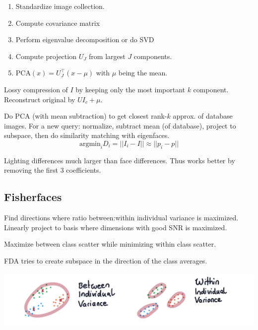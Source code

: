 \begin{definition}
  \begin{enumerate}
    \item Standardize image collection.
    \item Compute covariance matrix
    \item Perform eigenvalue decomposition or do SVD
    \item Compute projection \(U_J\) from largest \(J\) components.
    \item \(\text{PCA}(x) = U_J^\top(x - \mu)\) with \(\mu\) being the mean.
  \end{enumerate}
\end{definition}

\begin{definition}
  Lossy compression of \(I\) by keeping only the most important \(k\) component. Reconstruct original by \(UI_c + \mu\).
\end{definition}

\begin{algorithm}
  Do PCA (with mean subtraction) to get closest rank-\(k\) approx. of database images. For a new query: normalize, subtract mean (of database), project to subspace, then do similarity matching with eigenfaces.
  \[\text{argmin}_i D_i = ||I_i - I|| \approx ||p_i - p||\]
\end{algorithm}

\begin{theorem}
  Lighting differences much larger than face differences. Thus works better by removing the first 3 coefficients.
\end{theorem}

\subsection{Fisherfaces}
Find directions where ratio between:within individual variance is maximized. Linearly project to basis where dimensions with good SNR is maximized.

\begin{algorithm}
  Maximize between class scatter while minimizing within class scatter.
\end{algorithm}

FDA tries to create subspace in the direction of the class averages.

\includegraphics*[width=\linewidth]{assets/variances.png}
